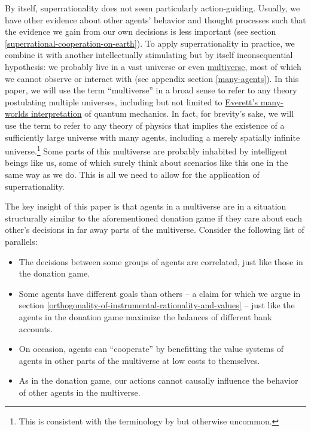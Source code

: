 By itself, superrationality does not seem particularly action-guiding.
Usually, we have other evidence about other agents' behavior and thought
processes such that the evidence we gain from our own decisions is less
important (see section
\ref{superrational-cooperation-on-earth}). To apply superrationality in practice, we
combine it with another intellectually stimulating but by itself
inconsequential hypothesis: we probably live in a vast universe or even
\href{https://en.wikipedia.org/wiki/Multiverse}{multiverse}, most
of which we cannot observe or interact with (see appendix section
\ref{many-agents}). In this paper,
we will use the term ``multiverse'' in a broad sense to refer to any
theory postulating multiple universes, including but not limited to
\href{https://en.wikipedia.org/wiki/Many-worlds_interpretation}{Everett's
many-worlds interpretation} of quantum mechanics. In fact, for
brevity's sake, we will use the term to refer to any theory of physics
that implies the existence of a sufficiently large universe with many
agents, including a merely spatially infinite
universe.\footnote{This is consistent with the terminology by 
  \citet{Tegmark2003-sl} but otherwise
  uncommon.} Some parts of this multiverse are probably inhabited by
intelligent beings like us, some of which surely think about scenarios
like this one in the same way as we do. This is all we need to allow for
the application of superrationality.

The key insight of this paper is that agents in a multiverse are in a
situation structurally similar to the aforementioned donation game if
they care about each other's decisions in far away parts of the
multiverse. Consider the following list of parallels:

\begin{itemize}
\item
  The decisions between some groups of agents are correlated, just like
  those in the donation game.
\item
  Some agents have different goals than others -- a claim for which we
  argue in section
  \ref{orthogonality-of-instrumental-rationality-and-values} -- just like the agents in
  the donation game maximize the balances of different bank accounts.
\item
  On occasion, agents can ``cooperate'' by benefitting the value systems
  of agents in other parts of the multiverse at low costs to themselves.
\item
  As in the donation game, our actions cannot causally influence the
  behavior of other agents in the multiverse.
\end{itemize}


